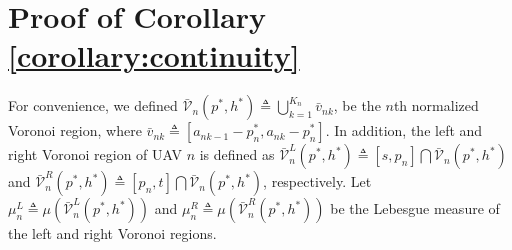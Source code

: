 \documentclass[smallabstract,smallcaptions]{dccpaper}
\newcommand{\Vor}{\ensuremath{\mathcal{V}}}         %
\newcommand{\junstart}{\color{black}}
\begin{document}
\junstart \section{Proof of Corollary \ref{corollary:continuity}}\label{proof:continuity} 

For convenience, we defined $\bar{\Vor}_n(p^*,
h^*)\triangleq\bigcup_{k=1}^{K_n}\bar{v}_{nk}$, be the $n$th normalized Voronoi region, where
$\bar{v}_{nk}\triangleq[a_{nk-1}-p^*_n,a_{nk}-p^*_n]$.
In addition, the left and right Voronoi region of UAV $n$ is defined as $\bar{\Vor}^{L}_{n}(p^*, h^*) \triangleq
[s,p_n]\bigcap\bar{\Vor}_{n}(p^*, h^*)$ and $\bar{\Vor}^{R}_{n}(p^*, h^*) \triangleq [p_n, t]\bigcap\bar{\Vor}_{n}(p^*,
h^*)$, respectively.  Let $\mu^L_n\triangleq\mu\left(\bar{\Vor}^{L}_{n}(p^*, h^*)\right)$ and
$\mu^R_n\triangleq\mu\left(\bar{\Vor}^{R}_{n}(p^*, h^*)\right)$ be the Lebesgue measure of the left and right Voronoi
regions.
\end{document}
